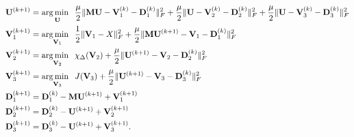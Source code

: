 \begin{equation}
  \label{admm:ae-updates-final}
  \begin{aligned}
    \mathbf{U}^{(k+1)} & = \operatorname*{arg\,min \;\;}_{\mathbf{U}}  
    \frac{\mu}{2} \|\mathbf{MU} - \mathbf{V}_1^{(k)} - \mathbf{D}_1^{(k)}\|_F^2  + \frac{\mu}{2} \|\mathbf{U} - \mathbf{V}_2^{(k)} - \mathbf{D}_2^{(k)}\|_F^2  + \frac{\mu}{2} \|\mathbf{U} - \mathbf{V}_3^{(k)} - \mathbf{D}_3^{(k)}\|_F^2 
    \\
    \mathbf{V}_1^{(k+1)} &= \operatorname*{arg\,min \;\;}_{\mathbf{V}_1} \frac{1}{2} \|\mathbf{V}_1 - X \|_F^2 + \frac{\mu}{2} \|\mathbf{MU}^{(k+1)} - \mathbf{V}_1 - \mathbf{D}_1^{(k)}\|_F^2 \\
    \mathbf{V}_2^{(k+1)} &= \operatorname*{arg\,min \;\;}_{\mathbf{V}_2} \chi_{\Delta}(\mathbf{V}_2) + \frac{\mu}{2} \|\mathbf{U}^{(k+1)} - \mathbf{V}_2 - \mathbf{D}_2^{(k)}\|_F^2 \\
    \mathbf{V}_3^{(k+1)} &= \operatorname*{arg\,min \;\;}_{\mathbf{V}_3} J(\mathbf{V}_3) + \frac{\mu}{2} \|\mathbf{U}^{(k+1)} - \mathbf{V}_3 - \mathbf{D}_3^{(k)}\|_F^2 \\
    \mathbf{D}_1^{(k+1)} &= \mathbf{D}_1^{(k)} - \mathbf{MU}^{(k+1)} + \mathbf{V}_1^{(k+1)} \\
    \mathbf{D}_2^{(k+1)} &= \mathbf{D}_2^{(k)} - \mathbf{U}^{(k+1)} + \mathbf{V}_2^{(k+1)} \\
    \mathbf{D}_3^{(k+1)} &= \mathbf{D}_3^{(k)} - \mathbf{U}^{(k+1)} + \mathbf{V}_3^{(k+1)}.
  \end{aligned}
\end{equation}

